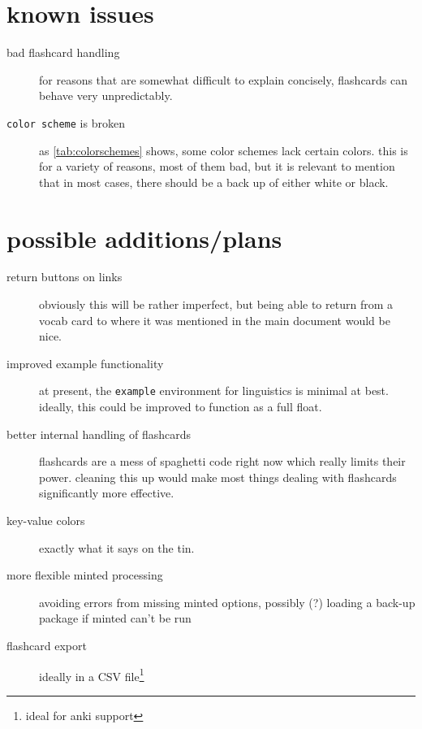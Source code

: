 \documentclass[lowerhead,12pt]{aesthetic}
\begin{document}
\section{known issues}
\begin{description}
  \item[bad flashcard handling] for reasons that are somewhat difficult to explain concisely, flashcards can behave very unpredictably.
  \item[\texttt{color scheme} is broken] as \vref{tab:colorschemes} shows, some color schemes lack certain colors. this is for a variety of reasons, most of them bad, but it is relevant to mention that in most cases, there should be a back up of either white or black.
\end{description}

\section{possible additions/plans}
\begin{description}
  \item[return buttons on links] obviously this will be rather imperfect, but being able to return from a vocab card to where it was mentioned in the main document would be nice.
  \item[improved example functionality] at present, the \texttt{example} environment for linguistics is minimal at best. ideally, this could be improved to function as a full float.
  \item[better internal handling of flashcards] flashcards are a mess of spaghetti code right now which really limits their power. cleaning this up would make most things dealing with flashcards significantly more effective.
  \item[key-value colors] exactly what it says on the tin.
  \item[more flexible minted processing] avoiding errors from missing minted options, possibly (?) loading a back-up package if minted can't be run
  \item[flashcard export] ideally in a CSV file\footnote{ideal for anki support}
\end{description}
\end{document}
